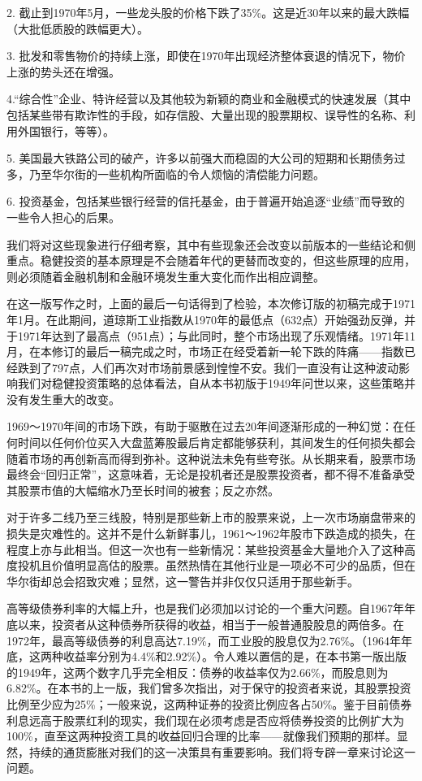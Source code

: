 \documentclass[12pt,oneside]{book}
\begin{document}
2. 截止到1970年5月，一些龙头股的价格下跌了35\%。这是近30年以来的最大跌幅（大批低质股的跌幅更大）。

3. 批发和零售物价的持续上涨，即使在1970年出现经济整体衰退的情况下，物价上涨的势头还在增强。

4.“综合性”企业、特许经营以及其他较为新颖的商业和金融模式的快速发展（其中包括某些带有欺诈性的手段，如存信股、大量出现的股票期权、误导性的名称、利用外国银行，等等）。

5. 美国最大铁路公司的破产，许多以前强大而稳固的大公司的短期和长期债务过多，乃至华尔街的一些机构所面临的令人烦恼的清偿能力问题。

6. 投资基金，包括某些银行经营的信托基金，由于普遍开始追逐“业绩”而导致的一些令人担心的后果。

我们将对这些现象进行仔细考察，其中有些现象还会改变以前版本的一些结论和侧重点。稳健投资的基本原理是不会随着年代的更替而改变的，但这些原理的应用，则必须随着金融机制和金融环境发生重大变化而作出相应调整。

在这一版写作之时，上面的最后一句话得到了检验，本次修订版的初稿完成于1971年1月。在此期间，道琼斯工业指数从1970年的最低点（632点）开始强劲反弹，并于1971年达到了最高点（951点）；与此同时，整个市场出现了乐观情绪。1971年11月，在本修订的最后一稿完成之时，市场正在经受着新一轮下跌的阵痛——指数已经跌到了797点，人们再次对市场前景感到惶惶不安。我们一直没有让这种波动影响我们对稳健投资策略的总体看法，自从本书初版于1949年问世以来，这些策略并没有发生重大的改变。

1969～1970年间的市场下跌，有助于驱散在过去20年间逐渐形成的一种幻觉：在任何时间以任何价位买入大盘蓝筹股最后肯定都能够获利，其间发生的任何损失都会随着市场的再创新高而得到弥补。这种说法未免有些夸张。从长期来看，股票市场最终会“回归正常”，这意味着，无论是投机者还是股票投资者，都不得不准备承受其股票市值的大幅缩水乃至长时间的被套；反之亦然。

对于许多二线乃至三线股，特别是那些新上市的股票来说，上一次市场崩盘带来的损失是灾难性的。这并不是什么新鲜事儿，1961～1962年股市下跌造成的损失，在程度上亦与此相当。但这一次也有一些新情况：某些投资基金大量地介入了这种高度投机且价值明显高估的股票。虽然热情在其他行业是一项必不可少的品质，但在华尔街却总会招致灾难；显然，这一警告并非仅仅只适用于那些新手。

高等级债券利率的大幅上升，也是我们必须加以讨论的一个重大问题。自1967年年底以来，投资者从这种债券所获得的收益，相当于一般普通股股息的两倍多。在1972年，最高等级债券的利息高达7.19\%，而工业股的股息仅为2.76\%。（1964年年底，这两种收益率分别为4.4\%和2.92\%）。令人难以置信的是，在本书第一版出版的1949年，这两个数字几乎完全相反：债券的收益率仅为2.66\%，而股息则为6.82\%。在本书的上一版，我们曾多次指出，对于保守的投资者来说，其股票投资比例至少应为25\%；一般来说，这两种证券的投资比例应各占50\%。鉴于目前债券利息远高于股票红利的现实，我们现在必须考虑是否应将债券投资的比例扩大为100\%，直至这两种投资工具的收益回归合理的比率——就像我们预期的那样。显然，持续的通货膨胀对我们的这一决策具有重要影响。我们将专辟一章来讨论这一问题。
\end{document}
